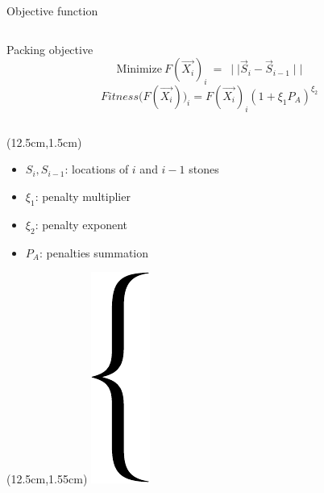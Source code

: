 \documentclass{EESD}
\begin{document}
\breakingframe{
\begin{textblock*}{13cm}(3.5cm,4cm)
\Huge\textbf{\textcolor{black}{How to arrange stones?}}
\end{textblock*}
}

\begin{frame}[t]{Objective function}\vspace{1pt}
\begin{columns}
\begin{column}{0.49\textwidth}
\begin{overprint}
\begin{block}{Packing objective}
    \begin{equation*}
        \text{Minimize}~F(\vec{X_i})_{i}~=~\mid\mid \vec{S}_{i} - \vec{S}_{i-1} \mid\mid
    \end{equation*}
    \begin{equation*}
        Fitness\Big(F(\vec{X_i})\Big)_{i} = F(\vec{X_i})_{i}(1 + \xi_{1} P_A)^{\xi_{2}}
    \end{equation*}
\end{block}
\end{overprint}
\end{column}
\end{columns}
\begin{textblock*}{3.2cm}(12.5cm,1.5cm)
    \tiny{
    \begin{itemize}
        \item $S_{i}, S_{i-1}$: locations of $i$ and $i-1$ stones
        \item $\xi_{1}$: penalty multiplier
        \item $\xi_{2}$: penalty exponent
        \item $P_{A}$: penalties summation
    \end{itemize}
    }
\end{textblock*}
\begin{textblock*}{3cm}(12.5cm,1.55cm)
    \includegraphics[height = 0.6\linewidth]{brace.pdf}
\end{textblock*}

\end{frame}
\end{document}
